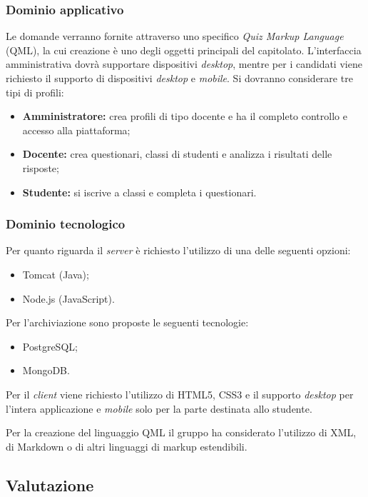 \documentclass[12pt,a4paper]{article}
\begin{document}
\subsubsection{Dominio applicativo}

Le domande verranno fornite attraverso uno specifico \textit{Quiz Markup Language} (QML), la cui creazione è uno degli oggetti principali del capitolato. L'interfaccia amministrativa dovrà supportare dispositivi \textit{desktop}, mentre per i candidati viene richiesto il supporto di dispositivi \textit{desktop} e \textit{mobile}. Si dovranno considerare tre tipi di profili:

\begin{itemize}
\item \textbf{Amministratore:} crea profili di tipo docente e ha il completo controllo e accesso alla piattaforma;
\item \textbf{Docente:} crea questionari, classi di studenti e analizza i risultati delle risposte;
\item \textbf{Studente:} si iscrive a classi e completa i questionari.
\end{itemize}

\subsubsection{Dominio tecnologico}

Per quanto riguarda il \textit{server} è richiesto l'utilizzo di una delle seguenti opzioni:

\begin{itemize}
\item Tomcat (Java);
\item Node.js (JavaScript).
\end{itemize}
Per l'archiviazione sono proposte le seguenti tecnologie:
\begin{itemize}
\item PostgreSQL;
\item MongoDB.
\end{itemize}
Per il \textit{client} viene richiesto l'utilizzo di HTML5, CSS3 e il supporto \textit{desktop} per l'intera applicazione e \textit{mobile} solo per la parte destinata allo studente.

Per la creazione del linguaggio QML il gruppo ha considerato l'utilizzo di XML, di Markdown o di altri linguaggi di markup estendibili.

\subsection{Valutazione}
\end{document}

